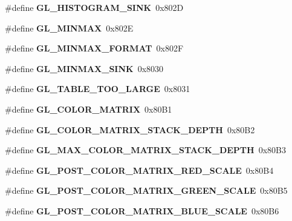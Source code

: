 \begin{DoxyCompactItemize}
\item 
\#define {\bfseries G\+L\+\_\+\+H\+I\+S\+T\+O\+G\+R\+A\+M\+\_\+\+S\+I\+N\+K}~0x802\+D\label{_s_d_l__opengl_8h_a9fbf1c60c5018d99f94dbab3f6c275e9}

\item 
\#define {\bfseries G\+L\+\_\+\+M\+I\+N\+M\+A\+X}~0x802\+E\label{_s_d_l__opengl_8h_ac47fcd809a49db130915a0b2da6795ac}

\item 
\#define {\bfseries G\+L\+\_\+\+M\+I\+N\+M\+A\+X\+\_\+\+F\+O\+R\+M\+A\+T}~0x802\+F\label{_s_d_l__opengl_8h_a4908c9eb24dfe46d85bf377a63175ef5}

\item 
\#define {\bfseries G\+L\+\_\+\+M\+I\+N\+M\+A\+X\+\_\+\+S\+I\+N\+K}~0x8030\label{_s_d_l__opengl_8h_abcfd969299540d4ef201e2d4152684c6}

\item 
\#define {\bfseries G\+L\+\_\+\+T\+A\+B\+L\+E\+\_\+\+T\+O\+O\+\_\+\+L\+A\+R\+G\+E}~0x8031\label{_s_d_l__opengl_8h_acb8af967f196db31e975a38467021707}

\item 
\#define {\bfseries G\+L\+\_\+\+C\+O\+L\+O\+R\+\_\+\+M\+A\+T\+R\+I\+X}~0x80\+B1\label{_s_d_l__opengl_8h_a30768d064fa99d8bb5996bafe7914612}

\item 
\#define {\bfseries G\+L\+\_\+\+C\+O\+L\+O\+R\+\_\+\+M\+A\+T\+R\+I\+X\+\_\+\+S\+T\+A\+C\+K\+\_\+\+D\+E\+P\+T\+H}~0x80\+B2\label{_s_d_l__opengl_8h_add7432a526d1858fb8e19c31574527eb}

\item 
\#define {\bfseries G\+L\+\_\+\+M\+A\+X\+\_\+\+C\+O\+L\+O\+R\+\_\+\+M\+A\+T\+R\+I\+X\+\_\+\+S\+T\+A\+C\+K\+\_\+\+D\+E\+P\+T\+H}~0x80\+B3\label{_s_d_l__opengl_8h_a00e586a66947fe6f51e0aec955ebf44a}

\item 
\#define {\bfseries G\+L\+\_\+\+P\+O\+S\+T\+\_\+\+C\+O\+L\+O\+R\+\_\+\+M\+A\+T\+R\+I\+X\+\_\+\+R\+E\+D\+\_\+\+S\+C\+A\+L\+E}~0x80\+B4\label{_s_d_l__opengl_8h_aaf54c3a8513abc52510d7e89b9e056d9}

\item 
\#define {\bfseries G\+L\+\_\+\+P\+O\+S\+T\+\_\+\+C\+O\+L\+O\+R\+\_\+\+M\+A\+T\+R\+I\+X\+\_\+\+G\+R\+E\+E\+N\+\_\+\+S\+C\+A\+L\+E}~0x80\+B5\label{_s_d_l__opengl_8h_a5cce706c60938c8abadc3adc82a41384}

\item 
\#define {\bfseries G\+L\+\_\+\+P\+O\+S\+T\+\_\+\+C\+O\+L\+O\+R\+\_\+\+M\+A\+T\+R\+I\+X\+\_\+\+B\+L\+U\+E\+\_\+\+S\+C\+A\+L\+E}~0x80\+B6\label{_s_d_l__opengl_8h_a422df7e6dfd366de9f78e790bb60d813}


\end{DoxyCompactItemize}
